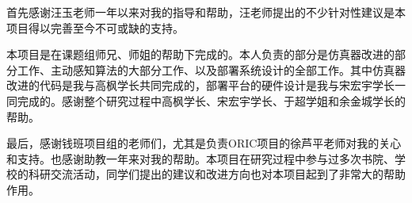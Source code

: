 
\begin{acknowledgements}

  首先感谢汪玉老师一年以来对我的指导和帮助，汪老师提出的不少针对性建议是本项目得以完善至今不可或缺的支持。

  本项目是在课题组师兄、师姐的帮助下完成的。本人负责的部分是仿真器改进的部分工作、主动感知算法的大部分工作、以及部署系统设计的全部工作。其中仿真器改进的代码是我与高枫学长共同完成的，部署平台的硬件设计是我与宋宏宇学长一同完成的。感谢整个研究过程中高枫学长、宋宏宇学长、于超学姐和余金城学长的帮助。

  最后，感谢钱班项目组的老师们，尤其是负责ORIC项目的徐芦平老师对我的关心和支持。也感谢助教一年来对我的帮助。本项目在研究过程中参与过多次书院、学校的科研交流活动，同学们提出的建议和改进方向也对本项目起到了非常大的帮助作用。
\end{acknowledgements}
